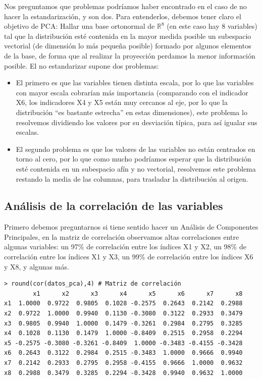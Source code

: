 \documentclass[12pt]{article}
\begin{document}
Nos preguntamos que problemas podríamos haber encontrado en el caso de
no hacer la estandarización, y son dos. Para entenderlos, debemos
tener claro el objetivo de PCA: Hallar una base ortonormal de
$\mathbb{R}^8$ (en este caso hay 8 variables) tal que la distribución
esté contenida en la mayor medida posible un subespacio vectorial (de
dimensión lo más pequeña posible) formado por algunos elementos de la
base, de forma que al realizar la proyección perdamos la menor
información posible. El no estandarizar supone dos problemas:
\begin{itemize}
\item El primero es que las
variables tienen distinta escala, por lo que las variables con mayor
escala cobrarían más importancia (comparando con el indicador X6, los
indicadores X4 y X5 están muy cercanos al eje, por lo que la
distribución ``es bastante estrecha'' en estas dimensiones), este
problema lo resolvemos dividiendo los valores por su desviación
típica, para así igualar sus escalas.
\item El segundo problema es que los valores de las variables no están
  centrados en torno al cero, por lo que como mucho podríamos esperar
  que la distribución esté contenida en un subespacio afín y no
  vectorial, resolvemos este problema restando la media de las columnas,
  para trasladar la distribución al origen.
\end{itemize}

\subsection{Análisis de la correlación de las variables} \label{sec:acp}

Primero debemos preguntarnos si tiene sentido hacer un Análisis de
Componentes Principales, en la matriz de correlación observamos altas
correlaciones entre algunas variables: un 97\% de correlación entre
los índices X1 y X2, un 98\% de correlación entre los índices X1 y X3,
un 99\% de correlación entre los índices X6 y X8, y algunas más.

\begin{verbatim}
> round(cor(datos_pca),4) # Matriz de correlación
        x1      x2      x3      x4      x5      x6      x7      x8
x1  1.0000  0.9722  0.9805  0.1028 -0.2575  0.2643  0.2142  0.2988
x2  0.9722  1.0000  0.9940  0.1130 -0.3080  0.3122  0.2933  0.3479
x3  0.9805  0.9940  1.0000  0.1479 -0.3261  0.2984  0.2795  0.3285
x4  0.1028  0.1130  0.1479  1.0000 -0.8409  0.2515  0.2958  0.2294
x5 -0.2575 -0.3080 -0.3261 -0.8409  1.0000 -0.3483 -0.4155 -0.3428
x6  0.2643  0.3122  0.2984  0.2515 -0.3483  1.0000  0.9666  0.9940
x7  0.2142  0.2933  0.2795  0.2958 -0.4155  0.9666  1.0000  0.9632
x8  0.2988  0.3479  0.3285  0.2294 -0.3428  0.9940  0.9632  1.0000
\end{verbatim}
\end{document}
